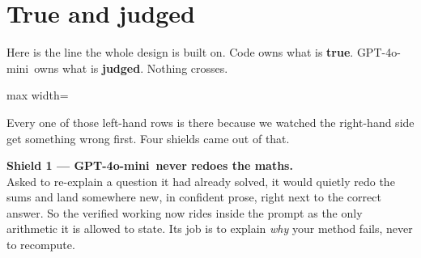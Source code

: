 \documentclass[11pt]{article}
\newcommand{\themodel}{GPT-4o-mini}
\begin{document}
\section{True and judged}

Here is the line the whole design is built on. Code owns what is \textbf{true}.
\themodel\ owns what is \textbf{judged}. Nothing crosses.

\vspace{0.5em}
\begin{center}
\begin{adjustbox}{max width=\textwidth}
\end{adjustbox}
\end{center}

\vspace{0.2em}
Every one of those left-hand rows is there because we watched the right-hand
side get something wrong first. Four shields came out of that.

\begin{shieldbox}
\textbf{Shield 1 --- \themodel\ never redoes the maths.}\\
Asked to re-explain a question it had already solved, it would quietly redo the
sums and land somewhere new, in confident prose, right next to the correct
answer. So the verified working now rides inside the prompt as the only
arithmetic it is allowed to state. Its job is to explain \emph{why} your method
fails, never to recompute.
\end{shieldbox}
\end{document}
